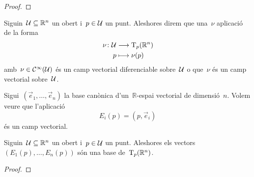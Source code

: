 \documentclass[../../main.tex]{subfiles}
\begin{document}
    \begin{proof}
    \end{proof}
    \begin{definition}
        \label{def:camp-vectorial-diferenciable}
        Siguin~\(\mathcal{U}\subseteq\mathbb{R}^{n}\) un obert i~\(p\in\mathcal{U}\) un punt.
        Aleshores direm que una~\(\nu\) aplicació de la forma
        \begin{align*}
            \nu\colon\mathcal{U}&\longrightarrow\operatorname{T}_{p}(\mathbb{R}^{n}) \\
            p&\longmapsto\nu(p)
        \end{align*}
        amb~\(\nu\in\mathcal{C}^{\infty}(\mathcal{U})\) és un camp vectorial diferenciable sobre~\(\mathcal{U}\) o que~\(\nu\) és un camp vectorial sobre~\(\mathcal{U}\).
    \end{definition}
    \begin{example}%
        \label{ex:camp-vectorial-canonic}
        Sigui~\((\vec{e}_{1},\dots,\vec{e}_{n})\) la base canònica d'un~\(\mathbb{R}\)-espai vectorial de dimensió~\(n\).
        Volem veure que l'aplicació
        \[
            E_{i}(p)=(p,\vec{e}_{i})
        \]
        és un camp vectorial.
    \end{example}
    \begin{solution}
    \end{solution}
    \begin{proposition}
        \label{prop:els-camps-vectorials-canonics-son-una-base-de-lespai-tangent}
        Siguin~\(\mathcal{U}\subseteq\mathbb{R}^{n}\) un obert i~\(p\in\mathcal{U}\) un punt.
        Aleshores els vectors~\((E_{1}(p),\dots,E_{n}(p))\) són una base de~\(\operatorname{T}_{p}(\mathbb{R}^{n})\).
    \end{proposition}
    \begin{proof}
    \end{proof}
\end{document}
